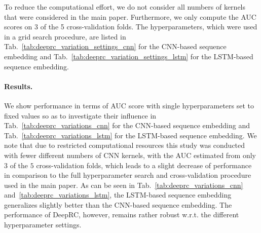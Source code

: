 \documentclass[oneside]{book}
\begin{document}
To reduce the computational effort,
we do not consider all numbers of kernels that were considered in the main paper.
Furthermore, we only compute the AUC scores on 3 of the 5 cross-validation folds.
The hyperparameters,
which were used in a grid search procedure,
are listed in Tab.~\ref{tab:deeprc_variation_settings_cnn} for the CNN-based sequence 
embedding and Tab.~\ref{tab:deeprc_variation_settings_lstm} for the LSTM-based sequence embedding.

\paragraph{Results.}
We show performance in terms of AUC score with single hyperparameters set to fixed values
so as to investigate their influence in
Tab.~\ref{tab:deeprc_variations_cnn} for the CNN-based sequence embedding 
and Tab.~\ref{tab:deeprc_variations_lstm} for the LSTM-based sequence embedding.
We note that due to restricted computational resources 
this study was conducted with fewer different numbers of CNN kernels,
with the AUC estimated from only $3$ of the $5$ cross-validation folds,
which leads to a slight decrease of performance in comparison to the full hyperparameter 
search and cross-validation procedure used in the main paper.
As can be seen in Tab.~\ref{tab:deeprc_variations_cnn} and~\ref{tab:deeprc_variations_lstm},
the LSTM-based sequence embedding generalizes slightly better than the CNN-based sequence embedding.
The performance of DeepRC, however, remains rather robust w.r.t. the different hyperparameter settings.
\end{document}
